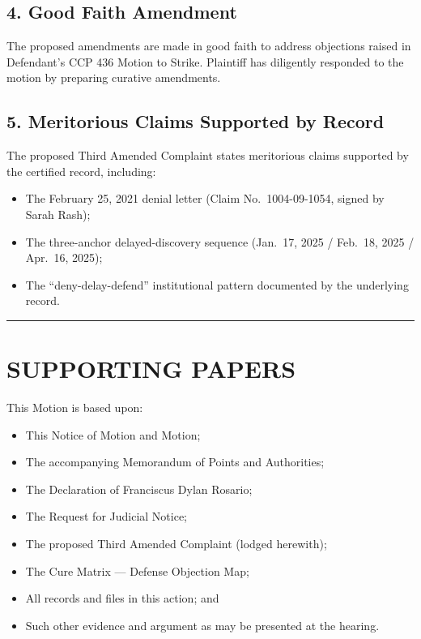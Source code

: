 \subsection{4. Good Faith Amendment}\label{good-faith-amendment}

The proposed amendments are made in good faith to address objections raised in Defendant's CCP \textsection{} 436 Motion to Strike. Plaintiff has diligently responded to the motion by preparing curative amendments.

\subsection{5. Meritorious Claims Supported by Record}\label{meritorious-claims-supported-by-record}

The proposed Third Amended Complaint states meritorious claims supported by the certified record, including:

\begin{itemize}
\tightlist
\item
  The February 25, 2021 denial letter (Claim No.~1004-09-1054, signed by Sarah Rash);
\item
  The three-anchor delayed-discovery sequence (Jan.~17, 2025 / Feb.~18, 2025 / Apr.~16, 2025);
\item
  The ``deny-delay-defend'' institutional pattern documented by the underlying record.
\end{itemize}

\begin{center}\rule{0.5\linewidth}{0.5pt}\end{center}

\section{SUPPORTING PAPERS}\label{supporting-papers}

This Motion is based upon:

\begin{itemize}
\tightlist
\item
  This Notice of Motion and Motion;
\item
  The accompanying Memorandum of Points and Authorities;
\item
  The Declaration of Franciscus Dylan Rosario;
\item
  The Request for Judicial Notice;
\item
  The proposed Third Amended Complaint (lodged herewith);
\item
  The Cure Matrix --- Defense Objection Map;
\item
  All records and files in this action; and
\item
  Such other evidence and argument as may be presented at the hearing.
\end{itemize}

